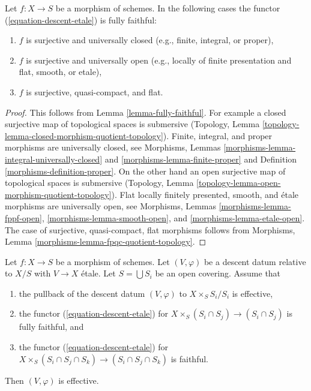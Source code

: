 \begin{lemma}
\label{lemma-fully-faithful-cases}
Let $f : X \to S$ be a morphism of schemes. In the following
cases the functor (\ref{equation-descent-etale}) is fully faithful:
\begin{enumerate}
\item $f$ is surjective and universally closed
(e.g., finite, integral, or proper),
\item $f$ is surjective and universally open
(e.g., locally of finite presentation and flat, smooth, or etale),
\item $f$ is surjective, quasi-compact, and flat.
\end{enumerate}
\end{lemma}

\begin{proof}
This follows from Lemma \ref{lemma-fully-faithful}.
For example a closed surjective map of topological spaces
is submersive (Topology, Lemma
\ref{topology-lemma-closed-morphism-quotient-topology}).
Finite, integral, and proper morphisms are universally closed, see
Morphisms, Lemmas \ref{morphisms-lemma-integral-universally-closed} and
\ref{morphisms-lemma-finite-proper} and
Definition \ref{morphisms-definition-proper}.
On the other hand an open surjective map of topological spaces
is submersive (Topology, Lemma
\ref{topology-lemma-open-morphism-quotient-topology}).
Flat locally finitely presented, smooth, and \'etale morphisms are
universally open, see
Morphisms, Lemmas \ref{morphisms-lemma-fppf-open},
\ref{morphisms-lemma-smooth-open}, and
\ref{morphisms-lemma-etale-open}.
The case of surjective, quasi-compact, flat morphisms follows
from Morphisms, Lemma \ref{morphisms-lemma-fpqc-quotient-topology}.
\end{proof}

\begin{lemma}
\label{lemma-reduce-to-affine}
Let $f : X \to S$ be a morphism of schemes.
Let $(V, \varphi)$ be a descent datum relative to $X/S$
with $V \to X$ \'etale. Let $S = \bigcup S_i$ be an
open covering. Assume that
\begin{enumerate}
\item the pullback of the descent datum $(V, \varphi)$
to $X \times_S S_i/S_i$ is effective,
\item the functor (\ref{equation-descent-etale})
for $X \times_S (S_i \cap S_j) \to (S_i \cap S_j)$ is fully faithful, and
\item the functor (\ref{equation-descent-etale})
for $X \times_S (S_i \cap S_j \cap S_k) \to (S_i \cap S_j \cap S_k)$
is faithful.
\end{enumerate}
Then $(V, \varphi)$ is effective.
\end{lemma}

